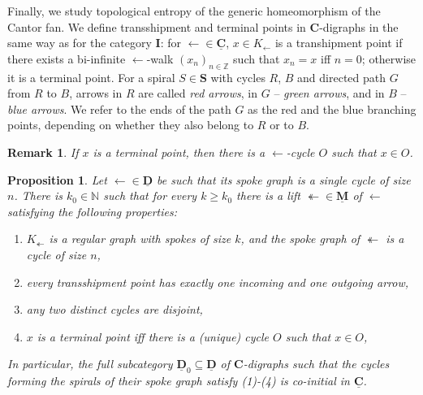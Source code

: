 \documentclass[12pt]{amsart}
\numberwithin{equation}{section}
\theoremstyle{plain}
\newtheorem{remark}[theorem]{\bf Remark}
\newtheorem{proposition}[theorem]{\bf Proposition}
\theoremstyle{definition}
\newcommand \la{\leftarrow}
\newcommand \tla{\twoheadleftarrow}
\newcommand \CCb{\mathbf{C}}
\newcommand \IIb{\mathbf{I}}
\newcommand \SSb{\mathbf{S}}
\newcommand \CCub{\underline{\mathbf{C}}}
\newcommand \DDub{\underline{\mathbf{D}}}
\newcommand \MMub{\underline{\mathbf{M}}}
\newcommand \NN{\mathbb{N}}
\newcommand \ZZ{\mathbb{Z}}
\begin{document}
Finally, we study topological entropy of the generic homeomorphism of the Cantor fan. We define transshipment and terminal points in $\CCb$-digraphs in the same way as for the category $\IIb$:  for $\la \in \CCub$, $x \in K_\la$ is a transhipment point if there exists a bi-infinite $\la$-walk $(x_n)_{n \in \ZZ}$ such that $x_n=x$ iff $n=0$; otherwise it is a terminal point.  For a spiral $S \in \SSb$ with cycles $R$, $B$ and directed path $G$ from $R$ to $B$, arrows in $R$ are called \emph{red arrows}, in $G$ -- \emph{green arrows}, and in $B$  -- \emph{blue arrows}. We refer to the ends of the path $G$ as the red and the blue branching points, depending on whether they also belong to $R$ or to $B$.

\begin{remark}
\label{re:TerminalCycle}
	If $x$ is a terminal point, then there is a $\la$-cycle $O$ such that $x \in O$. 
\end{remark}


\begin{proposition}
	\label{pr:TopEntropy}
	Let $\leftarrow \in \DDub$ be such that its spoke graph is a single cycle of size $n$. There is $k_0 \in \NN$ such that for every $k \geq k_0$ there is a lift $\tla \in \MMub$ of $\la$ satisfying the following properties:
	\begin{enumerate}
		\item $K_\tla$ is a regular graph with spokes of size $k$, and the spoke graph of $\twoheadleftarrow$ is a cycle of size $n$,
		\item every transshipment point has exactly one incoming and one outgoing arrow,
		\item any two distinct cycles are disjoint,
		\item $x$ is a terminal point iff there is a (unique) cycle $O$ such that $x \in O$,
	\end{enumerate}
	In particular, the full subcategory $\DDub_0 \subseteq \DDub$ of $\CCb$-digraphs such that the cycles forming the spirals of their spoke graph satisfy (1)-(4) is co-initial in $\CCub$.
\end{proposition}
\end{document}
